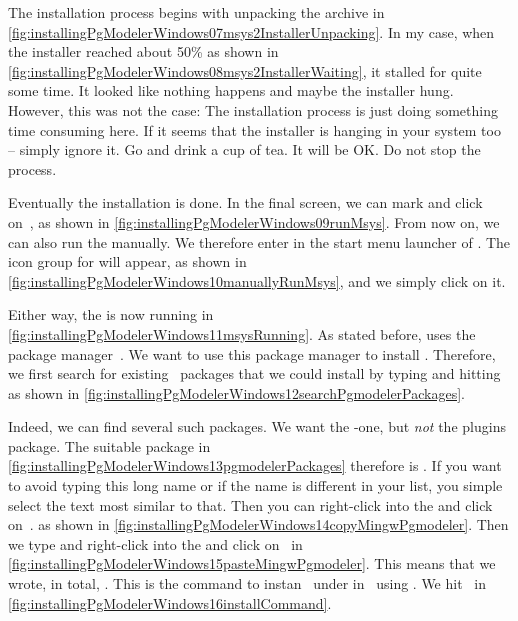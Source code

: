 The installation process begins with unpacking the archive in \cref{fig:installingPgModelerWindows07msys2InstallerUnpacking}.
In my case, when the installer reached about 50\% as shown in \cref{fig:installingPgModelerWindows08msys2InstallerWaiting}, it stalled for quite some time.
It looked like nothing happens and maybe the installer hung.
However, this was not the case:
The installation process is just doing something time consuming here.
If it seems that the installer is hanging in your system too -- simply ignore it.
Go and drink a cup of tea.
It will be OK.
Do not stop the process.

Eventually the installation is done.
In the final screen, we can mark  and click on~, as shown in \cref{fig:installingPgModelerWindows09runMsys}.
From now on, we can also run the   manually.
We therefore enter  in the start menu launcher of \microsoftWindows.
The icon group for  will appear, as shown in \cref{fig:installingPgModelerWindows10manuallyRunMsys}, and we simply click on it.

Either way, the   is now running in \cref{fig:installingPgModelerWindows11msysRunning}.
As stated before,  uses the  package manager~\cite{VGL2002:P,TOSID2025L:COMPMS}.
We want to use this package manager to install \pgmodeler.
Therefore, we first search for existing \pgmodeler\ packages that we could install by typing  and hitting~\keys{\return} as shown in \cref{fig:installingPgModelerWindows12searchPgmodelerPackages}.

Indeed, we can find several such packages.
We want the -one, but \emph{not} the plugins package.
The suitable package in \cref{fig:installingPgModelerWindows13pgmodelerPackages} therefore is .
If you want to avoid typing this long name or if the name is different in your list, you simple select the text most similar to that.
Then you can right-click into the  and click on~. as shown in  \cref{fig:installingPgModelerWindows14copyMingwPgmodeler}.
Then we type  and right-click into the  and click on~ in \cref{fig:installingPgModelerWindows15pasteMingwPgmodeler}.
This means that we wrote, in total, .
This is the command to instan \pgmodeler\ under  in \microsoftWindows\ using .
We hit~\keys{\return} in \cref{fig:installingPgModelerWindows16installCommand}.

